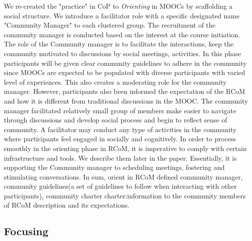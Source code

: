 \documentclass[format=acmsmall, review=false, screen=true]{acmart}
\newcommand{\msb}[1]{{\textcolor{blue}{ [Michael: #1]}}}
\begin{document}
We re-created the "practice" in CoP to \textit{Orienting} in MOOCs by scaffolding a social structure. We introduce a facilitator role with a specific designated name "Community Manager" to each clustered group. The recruitment of the community manager is conducted based on the interest at the course initiation. The role of the Community manager is to facilitate the interactions, keep the community motivated to discussions by social meetings, activities. In this phase participants will be given clear community guidelines to adhere in the community since MOOCs are expected to be populated with diverse participants with varied level of experiences. This also creates a moderating role for the community manager. However, participants also been informed the expectation of the RCoM and how it is different from traditional discussions in the MOOC. The community manager facilitated relatively small group of members make easier to navigate through discussions and develop social process and begin to reflect sense of community. A facilitator may conduct any type of activities in the community where participants feel engaged in socially and cognitively. In order to process smoothly in the orienting phase in RCoM, it is imperative to comply with certain infrastructure and tools. We describe them later in the paper. Essentially, it is supporting the Community manager to scheduling meetings, fostering and stimulating conversations. In sum, orient in RCoM defined community manager, community guidelines(a set of guidelines to follow when interacting with other participants), community charter charter:information to the community members of RCoM description and its expectations.

\subsection{Focusing}
\end{document}
